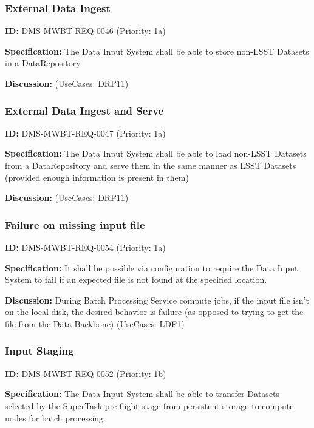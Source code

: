 \documentclass[SE,toc,lsstdraft]{lsstdoc}
\begin{document}
\subsubsection{External Data Ingest}

\label{DMS-MWBT-REQ-0046}
\textbf{ID:} DMS-MWBT-REQ-0046 (Priority: 1a)

\textbf{Specification:}
The Data Input System shall be able to store non-LSST Datasets in a DataRepository

\textbf{Discussion:}
(UseCases: DRP11)

\subsubsection{External Data Ingest and Serve}

\label{DMS-MWBT-REQ-0047}
\textbf{ID:} DMS-MWBT-REQ-0047 (Priority: 1a)

\textbf{Specification:}
The Data Input System shall be able to load non-LSST Datasets from a DataRepository and serve them in the same manner as LSST Datasets (provided enough information is present in them)

\textbf{Discussion:}
(UseCases: DRP11)

\subsubsection{Failure on missing input file}

\label{DMS-MWBT-REQ-0054}
\textbf{ID:} DMS-MWBT-REQ-0054 (Priority: 1a)

\textbf{Specification:}
It shall be possible via configuration to require the Data Input System to fail if an expected file is not found at the specified location.

\textbf{Discussion:}
During Batch Processing Service compute jobs, if the input file isn't on the local disk, the desired behavior is failure (as opposed to trying to get the file from the Data Backbone) (UseCases: LDF1)

\subsubsection{Input Staging}

\label{DMS-MWBT-REQ-0052}
\textbf{ID:} DMS-MWBT-REQ-0052 (Priority: 1b)

\textbf{Specification:}
The Data Input System shall be able to transfer Datasets selected by the SuperTask pre-flight stage from persistent storage to compute nodes for batch processing.
\end{document}
